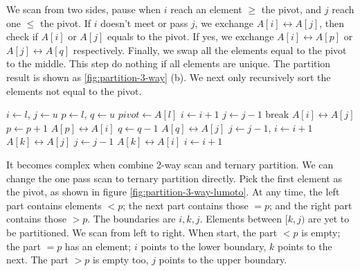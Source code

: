 \documentclass[b5paper]{article}
\begin{document}
We scan from two sides, pause when $i$ reach an element $\geq$ the pivot, and $j$ reach one $\leq$ the pivot. If $i$ doesn't meet or pass $j$, we exchange $A[i] \leftrightarrow A[j]$, then check if $A[i]$ or $A[j]$ equals to the pivot. If yes, we exchange $A[i] \leftrightarrow A[p]$ or $A[j] \leftrightarrow A[q]$ respectively. Finally, we swap all the elements equal to the pivot to the middle. This step do nothing if all elements are unique. The partition result is shown as \cref{fig:partition-3-way} (b). We next only recursively sort the elements not equal to the pivot.

\begin{algorithmic}[1]
    \State $i \gets l$, $j \gets u$
    \State $p \gets l$, $q \gets u$ 
    \State $pivot \gets A[l]$
    \Loop
      \Repeat
        \State $i \gets i + 1$
       
      \Repeat
        \State $j \gets j - 1$
       
        \State break
      \EndIf
      \State {} $A[i] \leftrightarrow A[j]$
       
        \State $p \gets p + 1$
        \State {} $A[p] \leftrightarrow A[i]$
      \EndIf
        \State $q \gets q - 1$
        \State {} $A[q] \leftrightarrow A[j]$
      \EndIf
    \EndLoop
      \State $j \gets j - 1$, $i \gets i + 1$
    \EndIf
     
      \State {} $A[k] \leftrightarrow A[j]$
      \State $j \gets j - 1$
    \EndFor
      \State {} $A[k] \leftrightarrow A[i]$
      \State $i \gets i + 1$
    \EndFor
    \State {}
    \State {}
  \EndIf
\EndProcedure
\end{algorithmic}

It becomes complex when combine 2-way scan and ternary partition. We can change the one pass scan to ternary partition directly. Pick the first element as the pivot, as shown in figure \cref{fig:partition-3-way-lumoto}. At any time, the left part contains elements $< p$; the next part contains those $= p$; and the right part contains those $> p$. The boundaries are $i, k, j$. Elements between $[k, j)$ are yet to be partitioned. We scan from left to right. When start, the part $< p$ is empty; the part $= p$ has an element; $i$ points to the lower boundary, $k$ points to the next. The part $> p$ is empty too, $j$ points to the upper boundary.
\end{document}
